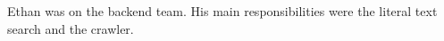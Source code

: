 Ethan was on the backend team. His main responsibilities were the literal text search and the crawler. 
